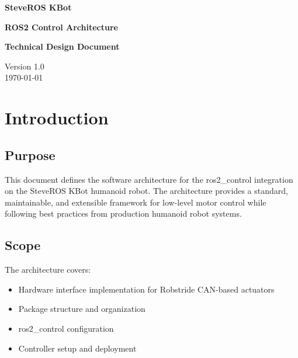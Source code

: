 \documentclass[12pt,a4paper]{article}
\begin{document}
\begin{titlepage}
    \centering
    \vspace*{2cm}
    
    \Huge\textbf{SteveROS KBot}
    \vspace{0.5cm}
    
    \Huge\textbf{ROS2 Control Architecture}
    \vspace{1cm}
    
    \Large\textbf{Technical Design Document}
    \vspace{2cm}
    
    \large Version 1.0\\
    \large \today
    \vspace{3cm}
    
    \begin{abstract}
        This document describes the architectural design for implementing ros2\_control 
        framework on the SteveROS KBot 20-DOF humanoid robot with Robstride actuators. 
        The architecture follows industry-standard patterns established by production-grade 
        humanoid robots including PAL Robotics TALOS and Pollen Robotics Reachy 2.
    \end{abstract}
    
\end{titlepage}

\tableofcontents
\newpage

\section{Introduction}

\subsection{Purpose}
This document defines the software architecture for the ros2\_control integration 
on the SteveROS KBot humanoid robot. The architecture provides a standard, maintainable, 
and extensible framework for low-level motor control while following best practices 
from production humanoid robot systems.

\subsection{Scope}
The architecture covers:
\begin{itemize}
    \item Hardware interface implementation for Robstride CAN-based actuators
    \item Package structure and organization
    \item ros2\_control configuration
    \item Controller setup and deployment
\end{itemize}
\end{document}
